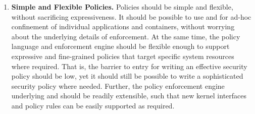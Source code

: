 \begin{enumerate}[font=\bfseries]
  \item \textbf{Simple and Flexible Policies.}
    Policies should be simple and flexible, without sacrificing expressiveness. It should
    be possible to use \bpfbox{} and \bpfcontain{} for ad-hoc confinement of individual
    applications and containers, without worrying about the underlying details of
    enforcement. At the same time, the policy language and enforcement engine should be
    flexible enough to support expressive and fine-grained policies that target specific
    system resources where required. That is, the barrier to entry for writing an
    effective security policy should be low, yet it should still be possible to write
    a sophisticated security policy where needed. Further, the policy enforcement engine
    underlying \bpfbox{} and \bpfcontain{} should be readily extensible, such that new
    kernel interfaces and policy rules can be easily supported as required.




\end{enumerate}
